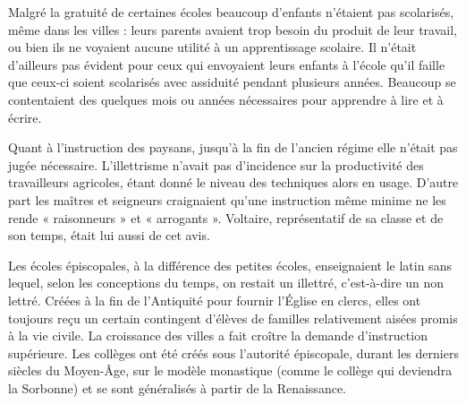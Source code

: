  Malgré la gratuité de certaines écoles beaucoup d'enfants n'étaient pas scolarisés, même dans les villes : leurs parents avaient trop besoin du produit de leur travail, ou bien ils ne voyaient aucune utilité à un apprentissage scolaire. Il n'était d'ailleurs pas évident pour ceux qui envoyaient leurs enfants à l'école qu'il faille que ceux-ci soient scolarisés avec assiduité pendant plusieurs années. Beaucoup se contentaient des quelques mois ou années nécessaires pour apprendre à lire et à écrire.

 Quant à l'instruction des paysans, jusqu'à la fin de l'ancien régime elle n'était pas jugée nécessaire. L'illettrisme n'avait pas d'incidence sur la productivité des travailleurs agricoles, étant donné le niveau des techniques alors en usage. D'autre part les maîtres et seigneurs craignaient qu'une instruction même minime ne les rende « raisonneurs » et « arrogants ». Voltaire, représentatif de sa classe et de son temps, était lui aussi de cet avis.

 Les écoles épiscopales, à la différence des petites écoles, enseignaient le latin sans lequel, selon les conceptions du temps, on restait un illettré, c'est-à-dire un non lettré. Créées à la fin de l'Antiquité pour fournir l'Église en clercs, elles ont toujours reçu un certain contingent d'élèves de familles relativement aisées promis à la vie civile. La croissance des villes a fait croître la demande d'instruction supérieure. Les collèges ont été créés sous l'autorité épiscopale, durant les derniers siècles du Moyen-Âge, sur le modèle monastique (comme le collège qui deviendra la Sorbonne) et se sont généralisés à partir de la Renaissance.

